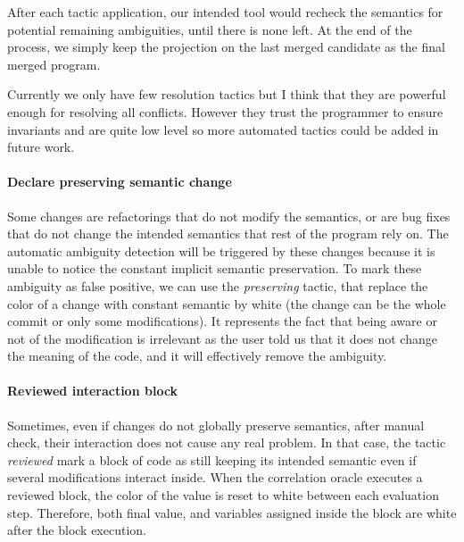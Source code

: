 \documentclass[a4paper,11pt]{article}
\newcommand\rtstate[3]{\langle #1, #2, #3\rangle}
\begin{document}
After each tactic application, our intended tool would recheck the
semantics for potential remaining ambiguities, until there is none
left. At the end of the process, we simply keep the projection on the
last merged candidate as the final merged program.

Currently we only have few resolution tactics but I think that they
are powerful enough for resolving all conflicts. However they trust
the programmer to ensure invariants and are quite low level so more
automated tactics could be added in future work.

\paragraph{Declare preserving semantic change}
%
Some changes are refactorings that do not modify the semantics, or are
bug fixes that do not change the intended semantics that rest of the
program rely on. The automatic ambiguity detection will be triggered
by these changes because it is unable to notice the constant implicit
semantic preservation. To mark these ambiguity as false positive, we
can use the \textit{preserving} tactic, that replace the color of a
change with constant semantic by white (the change can be the whole
commit or only some modifications). It represents the fact that being
aware or not of the modification is irrelevant as the user told us
that it does not change the meaning of the code, and it will
effectively remove the ambiguity.

\paragraph{Reviewed interaction block}
%
Sometimes, even if changes do not globally preserve semantics, after
manual check, their interaction does not cause any real problem. In
that case, the tactic \textit{reviewed} mark a block of code as still
keeping its intended semantic even if several modifications interact
inside. When the correlation oracle executes a reviewed block, the
color of the value is reset to white between each evaluation
step. Therefore, both final value, and variables assigned inside the
block are white after the block execution.
\end{document}
